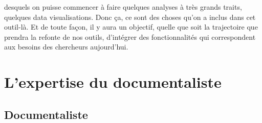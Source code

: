 desquels on puisse commencer à faire quelques analyses à très grands traits, quelques data visualisations.  Donc ça, ce sont des choses qu'on a inclus dans cet outil-là. Et de toute façon, il y aura un objectif, quelle que soit la trajectoire que prendra la refonte de nos outils, d'intégrer des fonctionnalités qui correspondent aux besoins des chercheurs aujourd'hui.

\section*{L’expertise du documentaliste }

\subsection*{Documentaliste} 

